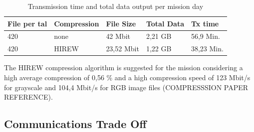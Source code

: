 \begin{table}[h]
\centering
\begin{tabular}{lllll}
File per tal & Compression & File Size  & Total Data & Tx time    \\ \hline\hline
420          & none        & 42 Mbit    & 2,21 GB    & 56,9 Min.  \\
420          & HIREW       & 23,52 Mbit & 1,22 GB    & 38,23 Min. \\ \hline
\end{tabular}
\caption{Transmission time and total data output per mission day}
\label{tab:Tx-tptal}
\end{table}

The HIREW compression algorithm is suggested for the mission considering a high average compression of 0,56 \% and a high compression speed of 123 Mbit/s for grayscale and 104,4 Mbit/s for RGB image files (COMPRESSSION PAPER REFERENCE). 

\subsection{Communications Trade Off}
\label{app:Com_TrOff}

